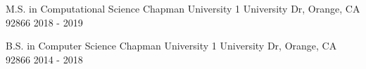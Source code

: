 

\begin{cventries}

  \cventry
    {M.S. in Computational Science} %
    {Chapman University} %
    {1 University Dr, Orange, CA 92866} %
    {2018 - 2019} %
    {
    }

  \cventry
    {B.S. in Computer Science} %
    {Chapman University} %
    {1 University Dr, Orange, CA 92866} %
    {2014 - 2018} %
    {
    }

\end{cventries}
